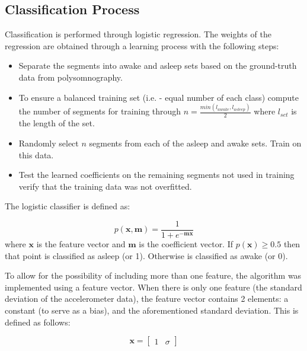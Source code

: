             \subsection{Classification Process}

                Classification is performed through logistic regression. The weights of the regression are obtained through a learning process with the following steps:

                \begin{itemize}
                    \item Separate the segments into awake and asleep sets based on the ground-truth data from polysomnography.
                    \item To ensure a balanced training set (i.e. - equal number of each class) compute the number of segments for training through $n = \frac{min(l_{awake},l_{asleep})}{2}$ where $l_{set}$ is the length of the set.
                    \item Randomly select $n$ segments from each of the asleep and awake sets. Train on this data.
                    \item Test the learned coefficients on the remaining segments not used in training verify that the training data was not overfitted.
                \end{itemize}

                The logistic classifier is defined as:

                \begin{equation}
                    p(\mathbf{x}, \mathbf{m}) = \frac{1}{1 + e^{-\mathbf{mx}}}
                \end{equation}
                where $\mathbf{x}$ is the feature vector and $\mathbf{m}$ is the coefficient vector. If $p(\mathbf{x}) \geq 0.5$ then that point is classified as asleep (or 1). Otherwise is classified as awake (or 0).

                To allow for the possibility of including more than one feature, the algorithm was implemented using a feature vector. When there is only one feature (the standard deviation of the accelerometer data), the feature vector contains 2 elements: a constant (to serve as a bias), and the aforementioned standard deviation. This is defined as follows: 

                \begin{equation}
                    \mathbf{x} = \begin{bmatrix} 1 & \sigma \end{bmatrix}
                \end{equation}

